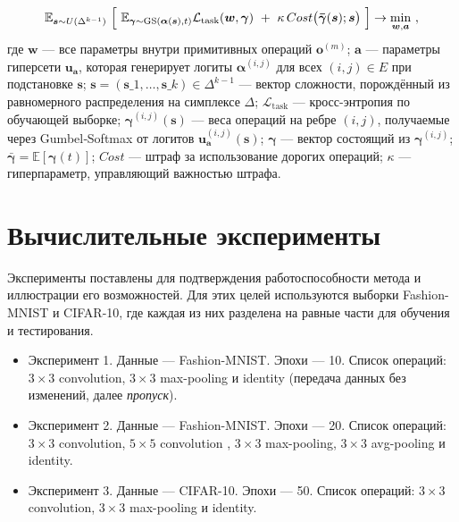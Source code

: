 \documentclass{article}
\begin{document}
$$
\mathbb E_{\boldsymbol s\sim U(\Delta^{k-1})} \ \Bigl[ \ {\mathbb E_{\boldsymbol\gamma\sim\mathrm{GS}(\boldsymbol\alpha(\boldsymbol s),t)} \mathcal L_{\text{task}}(\boldsymbol w,\boldsymbol\gamma)} \ +\  \kappa\,Cost\bigl(\boldsymbol{\bar\gamma}(\boldsymbol s);\boldsymbol s\bigr) \ \Bigr] \rightarrow \min_{\boldsymbol w,\boldsymbol a} \ , 
$$
где $\boldsymbol w$ --- все параметры внутри примитивных операций $\mathbf{o}^{(m)}$;
$\boldsymbol a$ --- параметры гиперсети $\boldsymbol{u}_{\boldsymbol a}$, которая генерирует логиты $\boldsymbol\alpha^{(i,j)}$ для всех $(i,j)\in E$ при подстановке $\boldsymbol{s}$;
$\boldsymbol{s} = (\boldsymbol{s}\_1,\dots,\boldsymbol{s}\_k)\in\Delta^{k-1}$ --- вектор сложности, порождённый из равномерного распределения на симплексе $\Delta$;
$\mathcal L_{\text{task}}$ --- кросс-энтропия по обучающей выборке;
$\boldsymbol\gamma^{(i,j)}(\boldsymbol{s})$ --- веса операций на ребре $(i,j)$, получаемые через Gumbel‐Softmax от логитов $\boldsymbol{u}_{\boldsymbol a}^{(i,j)}(\boldsymbol{s})$; 
$\boldsymbol\gamma$ --- вектор состоящий из $\boldsymbol\gamma^{(i,j)}$;
$\boldsymbol{\bar\gamma} = \mathbb E[\boldsymbol{\gamma}(t)]$; 
$Cost$ --- штраф за использование дорогих операций;
$\kappa$ --- гиперпараметр, управляющий важностью штрафа.


\section{Вычислительные эксперименты}

Эксперименты поставлены для подтверждения работоспособности метода и иллюстрации его возможностей. Для этих целей используются выборки Fashion-MNIST и CIFAR-10, где каждая из них разделена на равные части для обучения и тестирования. 

\begin{itemize}
    \item Эксперимент 1. Данные --- Fashion-MNIST. Эпохи --- 10. Список операций: \(3{\times}3\) convolution, \(3{\times}3\) max-pooling и identity (передача данных без изменений, далее \textit{пропуск}).
    \item Эксперимент 2. Данные --- Fashion-MNIST. Эпохи --- 20. Список операций: \(3{\times}3\) convolution, \(5{\times}5\) convolution , \(3{\times}3\) max-pooling, \(3{\times}3\) avg-pooling и identity.
    \item Эксперимент 3. Данные --- CIFAR-10. Эпохи --- 50. Список операций: \(3{\times}3\) convolution, \(3{\times}3\) max-pooling и identity.
    
\end{itemize}
\end{document}
